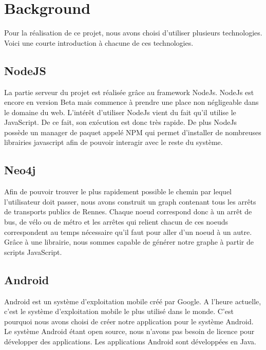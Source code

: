 \documentclass[twocolumn]{article}   		%
\begin{document}
\section{Background}

Pour la r\'ealisation de ce projet, nous avons choisi d'utiliser plusieurs technologies. Voici une courte introduction \`a chacune de ces technologies.
	\subsection{NodeJS}

	La partie serveur du projet est r\'ealis\'ee gr\^ace au framework NodeJs. NodeJs est encore en version Beta mais commence \`a prendre une place non n\'egligeable dans le domaine du web. L'int\'er\^et d'utiliser NodeJs vient du fait qu'il utilise le JavaScript. De ce fait, son ex\'ecution est donc tr\`es rapide. De plus NodeJs poss\`ede un manager de paquet appel\'e NPM qui permet d'installer de nombreuses librairies javascript afin de pouvoir interagir avec le reste du syst\`eme.

	\subsection{Neo4j}

	Afin de pouvoir trouver le plus rapidement possible le chemin par lequel l'utilisateur doit passer, nous avons construit un graph contenant tous les arr\^ets de transports publics de Rennes. Chaque noeud correspond donc \`a un arr\^et de bus, de v\'elo ou de m\'etro et les arr\^etes qui relient chacun de ces noeuds correspondent au temps n\'ecessaire qu'il faut pour aller d'un noeud \`a un autre. Gr\^ace \`a une librairie, nous sommes capable de g\'en\'erer notre graphe \`a partir de scripts JavaScript.
	
	\subsection{Android}
	
	Android est un syst\`eme d'exploitation mobile cr\'e\'e par Google. A l'heure actuelle, c'est le syst\`eme d'exploitation mobile le plus utilis\'e dans le monde. C'est pourquoi nous avons choisi de cr\'eer notre application pour le syst\`eme Android. Le syst\`eme Android \'etant open source, nous n'avons pas besoin de licence pour d\'evelopper des applications. Les applications Android sont d\'evelopp\'ees en Java.
	
\end{document}
